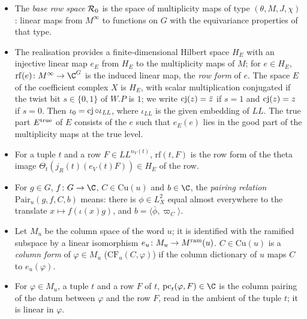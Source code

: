 \begin{itemize}
\item The \emph{base row space} $\mathcal{R}_0$ is the space of multiplicity maps of type $(\theta,M,J,\chi)$: linear
maps from $M^{\infty}$ to functions on $G$ with the equivariance properties of that type.
\item The realisation provides a finite-dimensional Hilbert space $H_E$ with an injective linear map $e_E$ from $H_E$ to
the multiplicity maps of $M$; for $e\in H_E$, $\mathrm{rf}(e)\colon M^{\infty}\to\C^G$ is the induced linear map,
the \emph{row form} of $e$. The space $E$ of the coefficient complex $X$ is $H_E$, with scalar multiplication
conjugated if the twist bit $s\in\{0,1\}$ of $W.P$ is $1$; we write $\operatorname{cj}(z)=\bar z$ if $s=1$ and
$\operatorname{cj}(z)=z$ if $s=0$. Then $\iota_0=\operatorname{cj}\circ\iota_{\mathit{LL}}$, where $\iota_{\mathit{LL}}$ is the
given embedding of $\mathit{LL}$. The true part $E^{\mathrm{true}}$ of $E$ consists of the $e$ such that $e_E(e)$ lies in
the good part of the multiplicity maps at the true level.
\item For a tuple $t$ and a row $F\in\mathit{LL}^{n_V(t)}$, $\mathrm{rf}(t,F)$ is the row form of the theta image
$\Theta_t(j_R(t)(e_V(t)F))\in H_E$ of the row.
\item For $g\in G$, $f\colon G\to\C$, $C\in\mathrm{Cu}(u)$ and $b\in\C$, the \emph{pairing relation}
$\mathrm{Pair}_u(g,f,C,b)$ means: there is $\phi\in L^2_X$ equal almost everywhere to the translate
$x\mapsto f(\iota(x)g)$, and $b=\langle\bar\phi,\varpi_C\rangle$.
\item Let $M_u$ be the column space of the word $u$; it is identified with the ramified subspace by a linear isomorphism
$e_u\colon M_u\to M^{\mathrm{ram}}(u)$. $C\in\mathrm{Cu}(u)$ is a \emph{column form} of $\varphi\in M_u$
($\mathrm{CF}_u(C,\varphi)$) if the column dictionary of $u$ maps $C$ to $e_u(\varphi)$.
\item For $\varphi\in M_u$, a tuple $t$ and a row $F$ of $t$, $\mathrm{pc}_t(\varphi,F)\in\C$ is the column pairing
of the datum between $\varphi$ and the row $F$, read in the ambient of the tuple $t$; it is linear in $\varphi$.
\end{itemize}

